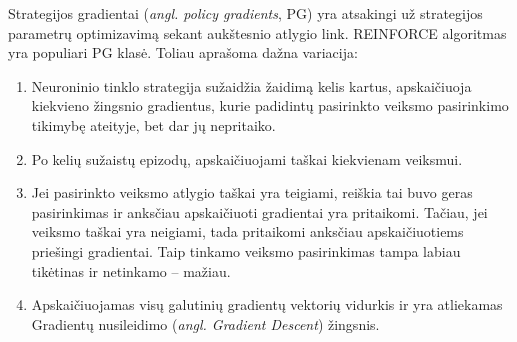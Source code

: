 \documentclass{VUMIFPSbakalaurinis}
\begin{document}
{
	Strategijos gradientai (\textit{angl. policy gradients}, PG) yra atsakingi už strategijos parametrų optimizavimą sekant aukštesnio atlygio link. REINFORCE algoritmas \cite{williams_1992} yra populiari PG klasė. Toliau aprašoma dažna variacija:
	
	\begin{enumerate}
		\item Neuroninio tinklo strategija sužaidžia žaidimą kelis kartus, apskaičiuoja kiekvieno žingsnio gradientus, kurie padidintų pasirinkto veiksmo pasirinkimo tikimybę ateityje, bet dar jų nepritaiko.
		\item Po kelių sužaistų epizodų, apskaičiuojami taškai kiekvienam veiksmui.
		\item Jei pasirinkto veiksmo atlygio taškai yra teigiami, reiškia tai buvo geras pasirinkimas ir anksčiau apskaičiuoti gradientai yra pritaikomi. Tačiau, jei veiksmo taškai yra neigiami, tada pritaikomi anksčiau apskaičiuotiems priešingi gradientai. Taip tinkamo veiksmo pasirinkimas tampa labiau tikėtinas ir netinkamo -- mažiau.
		\item Apskaičiuojamas visų galutinių gradientų vektorių vidurkis ir yra atliekamas Gradientų nusileidimo (\textit{angl. Gradient Descent}) žingsnis.
	\end{enumerate}
}
\end{document}

